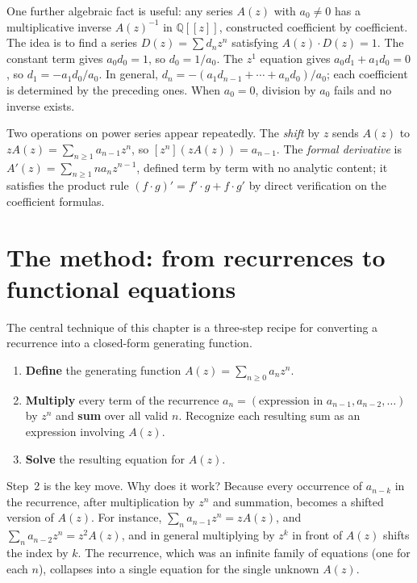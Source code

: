 One further algebraic fact is useful: any series $A(z)$ with $a_0 \ne 0$ has a multiplicative inverse $A(z)^{-1}$ in $\mathbb{Q}[[z]]$, constructed coefficient by coefficient. The idea is to find a series $D(z) = \sum d_n z^n$ satisfying $A(z) \cdot D(z) = 1$. The constant term gives $a_0 d_0 = 1$, so $d_0 = 1/a_0$. The $z^1$ equation gives $a_0 d_1 + a_1 d_0 = 0$, so $d_1 = -a_1 d_0 / a_0$. In general, $d_n = -(a_1 d_{n-1} + \cdots + a_n d_0)/a_0$; each coefficient is determined by the preceding ones. When $a_0 = 0$, division by $a_0$ fails and no inverse exists.

Two operations on power series appear repeatedly. The \emph{shift} by $z$ sends $A(z)$ to $z A(z) = \sum_{n \ge 1} a_{n-1} z^n$, so $[z^n](zA(z)) = a_{n-1}$. The \emph{formal derivative} is $A'(z) = \sum_{n \ge 1} n a_n z^{n-1}$, defined term by term with no analytic content; it satisfies the product rule $(f \cdot g)' = f' \cdot g + f \cdot g'$ by direct verification on the coefficient formulas.

\section*{The method: from recurrences to functional equations}

The central technique of this chapter is a three-step recipe for converting a recurrence into a closed-form generating function.

\begin{enumerate}
\item \textbf{Define} the generating function $A(z) = \sum_{n \ge 0} a_n z^n$.
\item \textbf{Multiply} every term of the recurrence $a_n = (\text{expression in } a_{n-1}, a_{n-2}, \ldots)$ by $z^n$ and \textbf{sum} over all valid $n$. Recognize each resulting sum as an expression involving $A(z)$.
\item \textbf{Solve} the resulting equation for $A(z)$.
\end{enumerate}

Step~2 is the key move. Why does it work? Because every occurrence of $a_{n-k}$ in the recurrence, after multiplication by $z^n$ and summation, becomes a shifted version of $A(z)$. For instance, $\sum_n a_{n-1} z^n = z A(z)$, and $\sum_n a_{n-2} z^n = z^2 A(z)$, and in general multiplying by $z^k$ in front of $A(z)$ shifts the index by $k$. The recurrence, which was an infinite family of equations (one for each $n$), collapses into a single equation for the single unknown $A(z)$.

